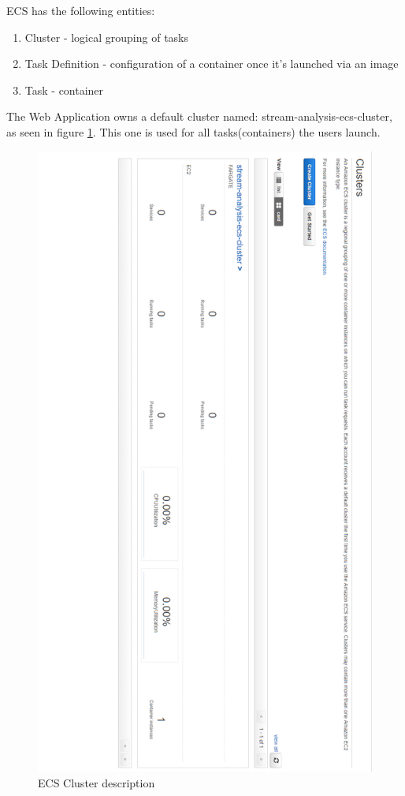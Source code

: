 \newpage

ECS has the following entities:

\begin{enumerate}
	\item Cluster - logical grouping of tasks 
	\item Task Definition - configuration of a container once it's launched via an image
	\item Task - container
\end{enumerate}

The Web Application owns a default cluster named: stream-analysis-ecs-cluster, as seen in figure \ref{fig:ecs-cluster}. This one is used for all tasks(containers) the users launch.

\begin{figure}[p]
	\centering
	\noindent
	\includegraphics[width=0.5\paperwidth]{./images/aws_resources/ECSCluster.PNG}
	\caption{ECS Cluster description}
	\label{fig:ecs-cluster}
\end{figure}

